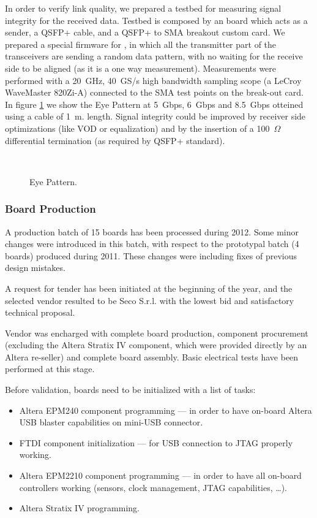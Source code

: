 In order to verify link quality, we prepared a testbed for measuring
signal integrity for the received data. Testbed is composed by an
\apenetp board which acts as a sender, a QSFP+ cable, and a QSFP+ to
SMA breakout custom card.
We prepared a special firmware for \apenetp, in which all the
transmitter part of the transceivers are sending a random data
pattern, with no waiting for the receive side to be aligned (as it is
a one way measurement). Measurements were performed with a 20~GHz,
40~GS/s high bandwidth sampling scope (a LeCroy WaveMaster 820Zi-A)
connected to the SMA test points on the break-out card.
In figure \ref{fig:subfig} we show the Eye Pattern at 5~Gbps, 6~Gbps
and 8.5~Gbps otteined using a cable of 1~m. length.
Signal integrity could be improved by receiver side optimizations
(like VOD or equalization) and by the insertion of a 100~$\Omega$
differential termination (as required by QSFP+ standard).

\begin{figure}
\centering
{} \quad
{} \\
 \quad
\caption{Eye Pattern.}
\label{fig:subfig}
\end{figure}



\subsubsection{Board Production} A production batch of 15 boards has been processed during 2012.  Some
minor changes were introduced in this batch, with respect to the
prototypal batch (4 boards) produced during 2011. These changes were
including fixes of previous design mistakes.

A request for tender has been initiated at the beginning of the year,
and the selected vendor resulted to be Seco S.r.l. with the lowest bid
and satisfactory technical proposal.

Vendor was encharged with complete board production, component
procurement (excluding the Altera Stratix IV component, which were
provided directly by an Altera re-seller) and complete board
assembly. Basic electrical tests have been performed at this stage.

Before validation, boards need to be initialized with a list of tasks:
\begin{itemize}
 \item Altera EPM240 component programming --- in order to have
 on-board Altera USB blaster capabilities on mini-USB connector.
 \item FTDI component initialization --- for USB connection to JTAG
 properly working.
 \item Altera EPM2210 component programming --- in order to have all
 on-board controllers working (sensors, clock management, JTAG
 capabilities, \dots).
 \item Altera Stratix IV programming.
\end{itemize}

